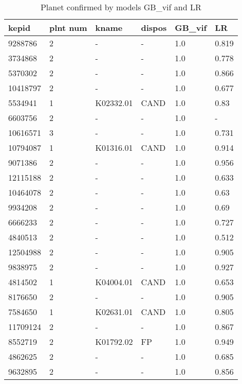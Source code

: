 \begin{table}[!htbp]
 \centering
 \caption{Planet confirmed by models GB\_vif and LR}
 \label{dataGBvifLRcreftab} 
  \begin{tabular}
{| 
 p{}| 
 p{}| 
 p{}| 
 p{}| 
 p{}| 
 p{}| 
}\hline 
\textbf{kepid} &\textbf{plnt num} &\textbf{kname} &\textbf{dispos} &\textbf{GB\_vif} &\textbf{LR} \\ \hline 
9288786 &2 &- &- &1.0 &0.819 \\ \hline 
3734868 &2 &- &- &1.0 &0.778 \\ \hline 
5370302 &2 &- &- &1.0 &0.866 \\ \hline 
10418797 &2 &- &- &1.0 &0.677 \\ \hline 
5534941 &1 &K02332.01 &CAND &1.0 &0.83 \\ \hline 
6603756 &2 &- &- &1.0 &- \\ \hline 
10616571 &3 &- &- &1.0 &0.731 \\ \hline 
10794087 &1 &K01316.01 &CAND &1.0 &0.914 \\ \hline 
9071386 &2 &- &- &1.0 &0.956 \\ \hline 
12115188 &2 &- &- &1.0 &0.633 \\ \hline 
10464078 &2 &- &- &1.0 &0.63 \\ \hline 
9934208 &2 &- &- &1.0 &0.69 \\ \hline 
6666233 &2 &- &- &1.0 &0.727 \\ \hline 
4840513 &2 &- &- &1.0 &0.512 \\ \hline 
12504988 &2 &- &- &1.0 &0.905 \\ \hline 
9838975 &2 &- &- &1.0 &0.927 \\ \hline 
4814502 &1 &K04004.01 &CAND &1.0 &0.653 \\ \hline 
8176650 &2 &- &- &1.0 &0.905 \\ \hline 
7584650 &1 &K02631.01 &CAND &1.0 &0.805 \\ \hline 
11709124 &2 &- &- &1.0 &0.867 \\ \hline 
8552719 &2 &K01792.02 &FP &1.0 &0.949 \\ \hline 
4862625 &2 &- &- &1.0 &0.685 \\ \hline 
9632895 &2 &- &- &1.0 &0.856 \\ \hline 

\end{tabular}
\end{table}
